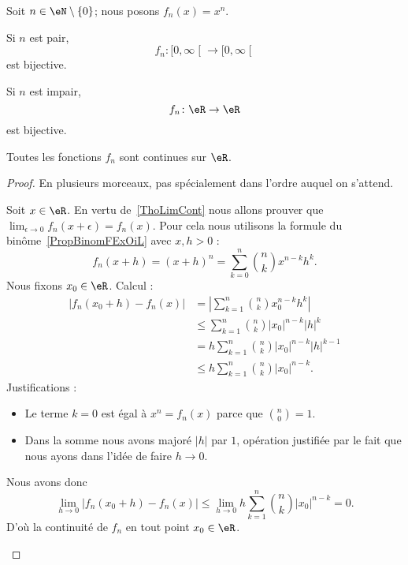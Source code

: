 \begin{proposition}     \label{PROPooXQYFooPxoEHE}
	Soit \( n\in \eN\setminus\{ 0 \}\); nous posons \( f_n(x)=x^n\).

	Si \( n\) est pair,
	\begin{equation}
		f_n\colon \mathopen[ 0 , \infty \mathclose[\to \mathopen[ 0 , \infty \mathclose[
	\end{equation}
	est bijective.

	Si \( n\) est impair,
	\begin{equation}
		f_n\colon \eR \to \eR
	\end{equation}
	est bijective.

	Toutes les fonctions \( f_n\) sont continues sur \( \eR\).
\end{proposition}

\begin{proof}
	En plusieurs morceaux, pas spécialement dans l'ordre auquel on s'attend.
	\begin{subproof}
		\spitem[Continuité]

		Soit \( x\in \eR\). En vertu de~\ref{ThoLimCont} nous allons prouver que \( \lim_{\epsilon\to 0}f_n(x+\epsilon)=f_n(x)\). Pour cela nous utilisons la formule du binôme~\ref{PropBinomFExOiL} avec \( x,h>0\) :
		\begin{equation}
			f_n(x+h)=(x+h)^n=\sum_{k=0}^n{n\choose k}x^{n-k}h^k.
		\end{equation}
		Nous fixons \( x_0\in \eR\). Calcul :
		\begin{subequations}
			\begin{align}
				| f_n(x_0+h)-f_n(x) | & =| \sum_{k=1}^n{n\choose k}x_0^{n-k}h^k |          \\
				                      & \leq \sum_{k=1}^n{n\choose k}| x_0 |^{n-k} |h|^k   \\
				                      & =h\sum_{k=1}^n{n\choose k}| x_0 |^{n-k}| h |^{k-1} \\
				                      & \leq h\sum_{k=1}^n{n\choose k}| x_0 |^{n-k}.
			\end{align}
		\end{subequations}
		Justifications :
		\begin{itemize}
			\item
			      Le terme \( k=0\) est égal à \( x^n=f_n(x)\) parce que \( {n\choose 0}=1\).
			\item
			      Dans la somme nous avons majoré \( | h |\) par \( 1\), opération justifiée par le fait que nous ayons dans l'idée de faire \( h\to 0\).
		\end{itemize}
		Nous avons donc
		\begin{equation}
			\lim_{h\to 0} | f_n(x_0+h)-f_n(x) | \leq\lim_{h\to 0}  h\sum_{k=1}^n{n\choose k}| x_0 |^{n-k}=0.
		\end{equation}
		D'où la continuité de \( f_n\) en tout point \( x_0\in \eR\).


\end{subproof}
\end{proof}
